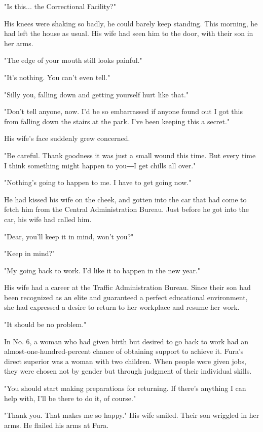 "Is this... the Correctional Facility?"

His knees were shaking so badly, he could barely keep standing. This
morning, he had left the house as usual. His wife had seen him to the
door, with their son in her arms.

"The edge of your mouth still looks painful."

"It's nothing. You can't even tell."

"Silly you, falling down and getting yourself hurt like that."

"Don't tell anyone, now. I'd be so embarrassed if anyone found out I got
this from falling down the stairs at the park. I've been keeping this a
secret."

His wife's face suddenly grew concerned.

"Be careful. Thank goodness it was just a small wound this time. But
every time I think something might happen to you―I get chills all over."

"Nothing's going to happen to me. I have to get going now."

He had kissed his wife on the cheek, and gotten into the car that had
come to fetch him from the Central Administration Bureau. Just before he
got into the car, his wife had called him.

"Dear, you'll keep it in mind, won't you?"

"Keep in mind?"

"My going back to work. I'd like it to happen in the new year."

His wife had a career at the Traffic Administration Bureau. Since their
son had been recognized as an elite and guaranteed a perfect educational
environment, she had expressed a desire to return to her workplace and
resume her work.

"It should be no problem."

In No. 6, a woman who had given birth but desired to go back to work had
an almost-one-hundred-percent chance of obtaining support to achieve it.
Fura's direct superior was a woman with two children. When people were
given jobs, they were chosen not by gender but through judgment of their
individual skills.

"You should start making preparations for returning. If there's anything
I can help with, I'll be there to do it, of course."

"Thank you. That makes me so happy." His wife smiled. Their son wriggled
in her arms. He flailed his arms at Fura.

